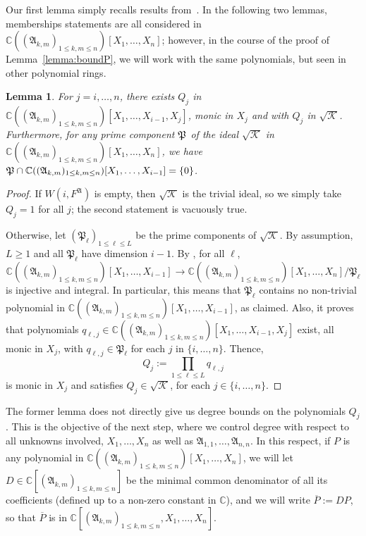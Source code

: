 \documentclass[12pt]{article}
\def\fp{\mathfrak{P}}
\def\A{\mathfrak{A}}
\def\C{\mathbb{C}}
\newtheorem{lemma}[theorem]{Lemma}
\begin{document}
Our first lemma simply recalls results from~\cite{EMP}.  In the
following two lemmas, memberships statements are all considered in
$\C((\A_{k,m})_{1 \le k,m \le n})[X_1,\dots,X_n]$; however, in the
course of the proof of Lemma~\ref{lemma:boundP}, we will work with the
same polynomials, but seen in other polynomial rings.
\begin{lemma}\label{lem:6.1}
  For $j=i,\dots,n$, there exists $Q_j$ in $\C((\A_{k,m})_{1 \le k,m
    \le n})[X_1,\dots,X_{i-1},X_j]$, monic in $X_j$ and with $Q_{j}$
  in $\sqrt{\mathscr{K}}$. Furthermore, for any prime component $\frak
  P$ of the ideal $\sqrt{\mathscr{K}}$ in $\C((\A_{k,m})_{1 \le k,m \le
    n})[X_1,\dots,X_n]$, we have $\frak P \cap \C((\A_{k,m})_{1 \le
    k,m \le n})[X_1,\dots,X_{i-1}] = \{0\}$.
\end{lemma}
\begin{proof}
  If $W(i,F^\A)$ is empty, then $\sqrt{\mathscr{K}}$ is the trivial
  ideal, so we simply take $Q_j=1$ for all $j$; the second statement
  is vacuously true.

  Otherwise, let $(\fp_\ell)_{1 \le \ell \leq L}$ be the prime
  components of $\sqrt{\mathscr{K}}$.  By assumption, $L \ge 1$
  and all $\fp_\ell$ have dimension $i-1$. By \cite[Proposition
    1]{EMP}, for all $\ell$,
  \[
    \C((\A_{k,m})_{1 \le k,m \le n})[X_1,\dots,X_{i-1}]\rightarrow\C((\A_{k,m})_{1 \le k,m \le n})[X_1,\dots,X_n]/\fp_\ell
  \] 
  is injective and integral. In particular, this means that $\fp_\ell$
  contains no non-trivial polynomial in $\C((\A_{k,m})_{1 \le k,m \le
    n})[X_1,\dots,X_{i-1}]$, as claimed. Also, it proves that polynomials
  $q_{\ell,j}\in\C((\A_{k,m})_{1 \le k,m \le
    n})[X_1,\dots,X_{i-1},X_j]$ exist, all monic in $X_j$, with
  $q_{\ell,j}\in \fp_\ell$ for each $j$ in $\{i,\hdots,n\}.$
  Thence, \[Q_{j} := \prod_{1 \le \ell\le L} q_{\ell,j}\] is monic in
  $X_j$ and satisfies $ Q_{j} \in \sqrt{\mathscr{K}}$, for each $j
  \in \{i,\hdots,n\}.$
\end{proof}
The former lemma does not directly give us degree bounds on the
polynomials $Q_j$. This is the objective of the next step, where we
control degree with respect to all unknowns involved, $X_1,\dots,X_n$
as well as $\A_{1,1},\dots,\A_{n,n}$.  In this respect, if $P$ is any
polynomial in $\C((\A_{k,m})_{1 \le k,m \le n})[X_1,\dots,X_n]$, we
will let $D \in \C[(\A_{k,m})_{1 \le k,m \le n}]$ be the minimal
common denominator of all its coefficients (defined up to a non-zero
constant in $\C$), and we will write $\overline P := D P$, so that
$\overline P$ is in $\C[(\A_{k,m})_{1 \le k,m \le n},X_1,\dots,X_n]$.
\end{document}

